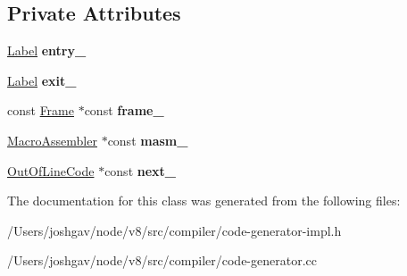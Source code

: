\subsection*{Private Attributes}
\begin{DoxyCompactItemize}
\item 
\hyperlink{classv8_1_1internal_1_1_label}{Label} {\bfseries entry\+\_\+}\hypertarget{classv8_1_1internal_1_1compiler_1_1_out_of_line_code_a052bb8c062d1b752d4490f382b806bf3}{}\label{classv8_1_1internal_1_1compiler_1_1_out_of_line_code_a052bb8c062d1b752d4490f382b806bf3}

\item 
\hyperlink{classv8_1_1internal_1_1_label}{Label} {\bfseries exit\+\_\+}\hypertarget{classv8_1_1internal_1_1compiler_1_1_out_of_line_code_a2962d15e51d52ad18c416bd5b6318daf}{}\label{classv8_1_1internal_1_1compiler_1_1_out_of_line_code_a2962d15e51d52ad18c416bd5b6318daf}

\item 
const \hyperlink{classv8_1_1internal_1_1compiler_1_1_frame}{Frame} $\ast$const {\bfseries frame\+\_\+}\hypertarget{classv8_1_1internal_1_1compiler_1_1_out_of_line_code_a9749c528bf509b3b492e0bdcc24d3b04}{}\label{classv8_1_1internal_1_1compiler_1_1_out_of_line_code_a9749c528bf509b3b492e0bdcc24d3b04}

\item 
\hyperlink{classv8_1_1internal_1_1_macro_assembler}{Macro\+Assembler} $\ast$const {\bfseries masm\+\_\+}\hypertarget{classv8_1_1internal_1_1compiler_1_1_out_of_line_code_a3dba1d27675739b554810f0e7295f87d}{}\label{classv8_1_1internal_1_1compiler_1_1_out_of_line_code_a3dba1d27675739b554810f0e7295f87d}

\item 
\hyperlink{classv8_1_1internal_1_1compiler_1_1_out_of_line_code}{Out\+Of\+Line\+Code} $\ast$const {\bfseries next\+\_\+}\hypertarget{classv8_1_1internal_1_1compiler_1_1_out_of_line_code_a78b13191019b3e28110f18ff3c363941}{}\label{classv8_1_1internal_1_1compiler_1_1_out_of_line_code_a78b13191019b3e28110f18ff3c363941}

\end{DoxyCompactItemize}


The documentation for this class was generated from the following files\+:\begin{DoxyCompactItemize}
\item 
/\+Users/joshgav/node/v8/src/compiler/code-\/generator-\/impl.\+h\item 
/\+Users/joshgav/node/v8/src/compiler/code-\/generator.\+cc\end{DoxyCompactItemize}
